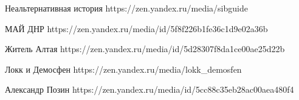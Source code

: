  
 
 
 
 

Неальтернативная история
https://zen.yandex.ru/media/sibguide

МАЙ ДНР
https://zen.yandex.ru/media/id/5f8f226b1fe36c1d9e02a36b

Житель Алтая
https://zen.yandex.ru/media/id/5d28307f8da1ce00ae25d22b

Локк и Демосфен
https://zen.yandex.ru/media/lokk_demosfen

Александр Позин
https://zen.yandex.ru/media/id/5cc88c35eb28ac00aea480f4
